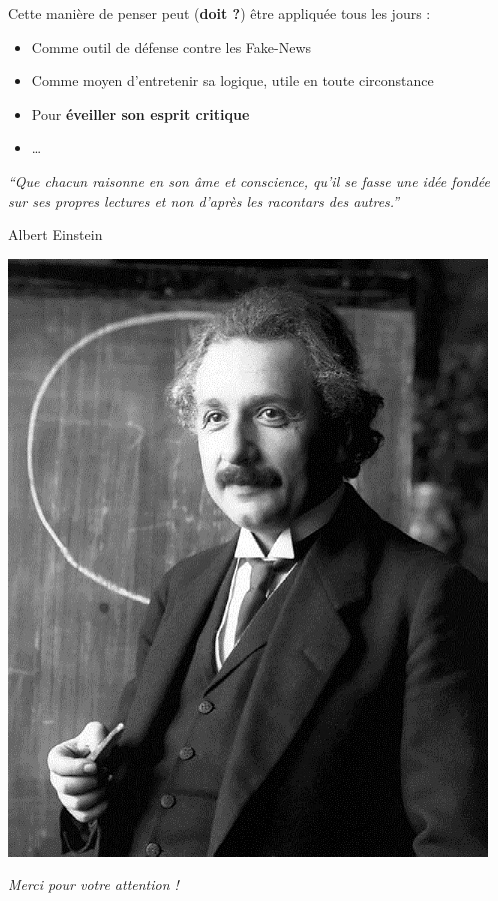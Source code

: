 \documentclass[usenames, dvipsnames, no-framenumber]{beamer}
\begin{document}
\begin{frame}%

Cette manière de penser peut (\textbf{doit ?}) être appliquée tous les jours \pause : 
\begin{itemize}
\item Comme outil de défense contre les Fake-News
\item Comme moyen d'entretenir sa logique, utile en toute circonstance
\item Pour \textbf{\alert{éveiller son esprit critique}}
\item \ldots
\end{itemize}

\end{frame}



\begin{frame}%
\begin{center}
\itshape
``Que chacun raisonne en son âme et conscience, qu'il se fasse une idée fondée sur ses propres lectures et non d'après les racontars des autres.''
\end{center}

\begin{flushright}
Albert Einstein
\end{flushright}

\begin{center}
\includegraphics[scale=0.2]{images/Einstein.jpg}
\end{center}
\end{frame}


\begin{frame}%
\vspace{2cm}
{\huge\color{umons-red}
\begin{center}
\textit{\textrm{Merci pour votre attention !}}
\end{center}}
\end{frame}
\end{document}
